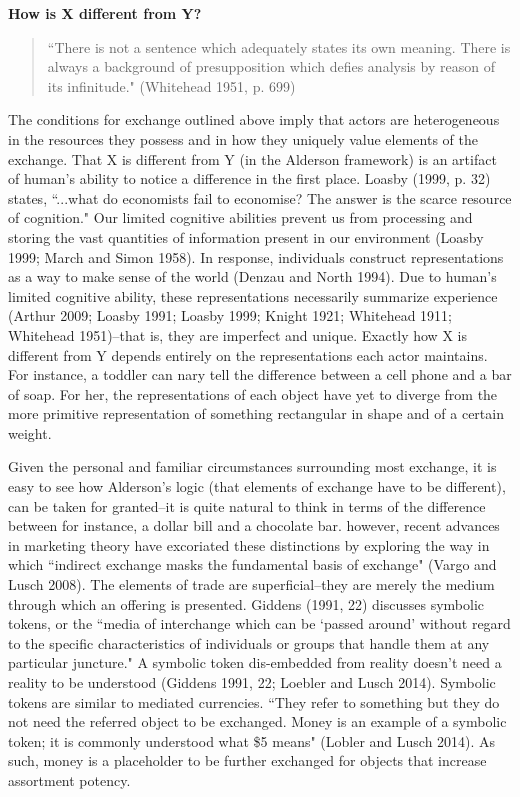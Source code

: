 \textbf{How is X different from Y?}
\begin{small}
\begin{quote}
``There is not a sentence which adequately states its own meaning. There is always a background of presupposition which defies analysis by reason of its infinitude." (Whitehead 1951, p. 699)
\end{quote}
\end{small}

The conditions for exchange outlined above imply that actors are heterogeneous in the resources they possess and in how they uniquely value elements of the exchange. That X is different from Y (in the Alderson framework) is an artifact of human's ability to notice a difference in the first place. Loasby (1999, p. 32) states, ``...what do economists fail to economise? The answer is the scarce resource of cognition." Our limited cognitive abilities prevent us from processing and storing the vast quantities of information present in our environment (Loasby 1999; March and Simon 1958). In response, individuals construct representations as a way to make sense of the world (Denzau and North 1994). Due to human's limited cognitive ability, these representations necessarily summarize experience (Arthur 2009; Loasby 1991; Loasby 1999; Knight 1921; Whitehead 1911; Whitehead 1951)--that is, they are imperfect and unique. Exactly how X is different from Y depends entirely on the representations each actor maintains. For instance, a toddler can nary tell the difference between a cell phone and a bar of soap. For her, the representations of each object have yet to diverge from the more primitive representation of something rectangular in shape and of a certain weight. 

Given the personal and familiar circumstances surrounding most exchange, it is easy to see how Alderson's logic (that elements of exchange have to be different), can be taken for granted--it is quite natural to think in terms of the difference between for instance, a dollar bill and a chocolate bar. however, recent advances in marketing theory have excoriated these distinctions by exploring the way in which ``indirect exchange masks the fundamental basis of exchange" (Vargo and Lusch 2008). The elements of trade are superficial--they are merely the medium through which an offering is presented. Giddens (1991, 22) discusses symbolic tokens, or the ``media of interchange which can be `passed around' without regard to the specific characteristics of individuals or groups that handle them at any particular juncture." A symbolic token dis-embedded from reality doesn't need a reality to be understood (Giddens 1991, 22; Loebler and Lusch 2014). Symbolic tokens are similar to mediated currencies. ``They refer to something but they do not need the referred object to be exchanged. Money is an example of a symbolic token; it is commonly understood what \$5 means" (Lobler and Lusch 2014). As such, money is a placeholder to be further exchanged for objects that increase assortment potency. 

